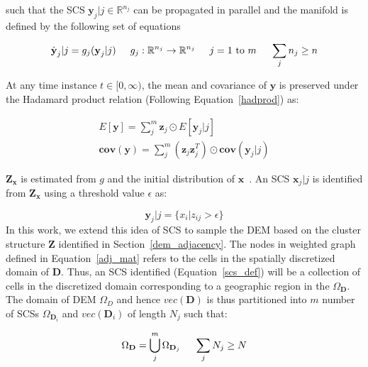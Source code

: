 \noindent such that the SCS $\textbf{y}_j|j \in \mathbb{R}^{n_j}$ can be propagated in parallel and the manifold is defined by the following set of equations

\begin{equation}
\dot{\textbf{y}}_j|j = g_j (\textbf{y}_j|j) \hspace{5mm} g_j:\mathbb{R}^{n_j} \rightarrow \mathbb{R}^{n_j} \hspace{5mm} j = 1 \text{ to } m \hspace{5mm} \sum_j n_j \geq n
\end{equation}

\noindent At any time instance $t \in [0,\infty)$, the mean and covariance of $\textbf{y}$ is preserved under the Hadamard product relation (Following Equation~\ref{hadprod}) as:

\begin{equation}
\label{had_prod}
\begin{array}{l}
E[\textbf{y}] = \sum_j^m \textbf{z}_j \odot E[\textbf{y}_j|j] \\ 
\textbf{cov}(\textbf{y}) = \sum_j^m (\textbf{z}_j\textbf{z}_j^T) \odot \textbf{cov}(\textbf{y}_j|j)
\end{array}
\end{equation}

$\textbf{Z}_{\textbf{x}}$ is estimated from $g$ and the initial distribution of $\textbf{x}$~\cite{Mukherjee_2017overlap}. An SCS $\textbf{x}_j|j$ is identified from $\textbf{Z}_{\textbf{x}}$ using a threshold value $\epsilon$ as:

\begin{equation}
\label{scs_def}
\textbf{y}_j|j = \lbrace x_i| z_{ij} > \epsilon \rbrace
\end{equation}
In this work, we extend this idea of SCS to sample the DEM based on the cluster structure $\textbf{Z}$ identified in Section~\ref{dem_adjacency}. The nodes in weighted graph defined in Equation~\ref{adj_mat} refers to the cells in the spatially discretized domain of $\textbf{D}$. Thus, an SCS identified (Equation~\ref{scs_def}) will be a collection of cells in the discretized domain corresponding to a geographic region in the $\Omega_{\textbf{D}}$. The domain of DEM $\Omega_D$ and hence $vec(\textbf{D})$ is thus partitioned into $m$ number of SCSs $\Omega_{\textbf{D}_i}$ and $vec(\textbf{D}_i)$ of length $N_j$ such that:

\begin{equation}
\Omega_{\textbf{D}} = \bigcup_j^m \Omega_{\textbf{D}_j} \hspace{5mm} \sum_j N_j \geq N
\end{equation}

